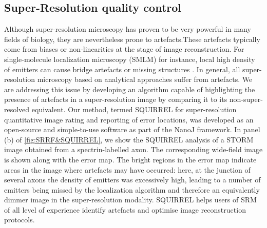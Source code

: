 \subsection*{Super-Resolution quality control}
Although super-resolution microscopy has proven to be very powerful in many fields of biology, they are nevertheless prone to artefacts.These artefacts typically come from biases or non-linearities at the stage of image reconstruction. For single-molecule localization microscopy (SMLM) for instance, local high density of emitters can cause bridge artefacts or missing structures \cite{burgert2015artifacts}. In general, all super-resolution microscopy based on analytical approaches suffer from artefacts. We are addressing this issue by developing an algorithm capable of highlighting the presence of artefacts in a super-resolution image by comparing it to its non-super-resolved equivalent. Our method, termed SQUIRREL for super-resolution quantitative image rating and reporting of error locations, was developed as an open-source and simple-to-use software as part of the NanoJ framework. 
In panel (b) of \ref{fig:SRRF&SQUIRREL}, we show the SQUIRREL analysis of a STORM image obtained from a spectrin-labelled axon. The corresponding wide-field image is shown along with the error map. The bright regions in the error map indicate areas in the image where artefacts may have occurred: here, at the junction of several axons the density of emitters was excessively high, leading to a number of emitters being missed by the localization algorithm and therefore an equivalently dimmer image in the super-resolution modality. 
SQUIRREL helps users of SRM of all level of experience identify artefacts and optimise image  reconstruction protocols.



